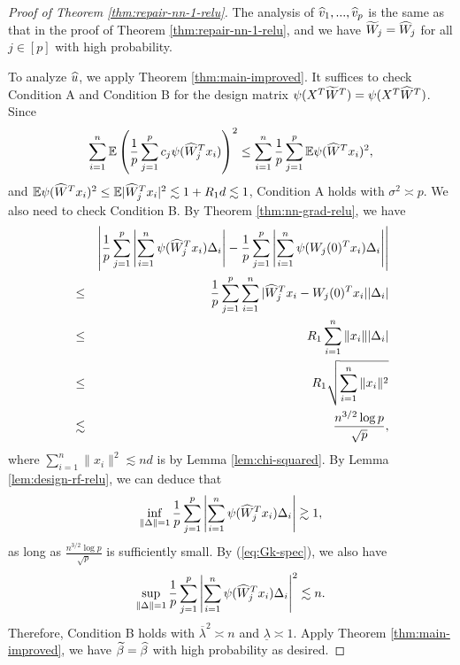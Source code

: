 \begin{proof}[Proof of Theorem \ref{thm:repair-nn-1-relu}]
The analysis of $\widehat{v}_1,...,\widehat{v}_p$ is the same as that in the proof of Theorem \ref{thm:repair-nn-1-relu}, and we have $\widetilde{W}_j=\widehat{W}_j$ for all $j\in[p]$ with high probability.

To analyze $\widehat{u}$, we apply Theorem \ref{thm:main-improved}. It suffices to check Condition A and Condition B for the design matrix $\psi(X^T\widetilde{W}^T)=\psi(X^T\widehat{W}^T)$. Since
$$\sum_{i=1}^n\mathbb{E}\left(\frac{1}{p}\sum_{j=1}^pc_j\psi(\widehat{W}_j^Tx_i)\right)^2\leq \sum_{i=1}^n\frac{1}{p}\sum_{j=1}^p\mathbb{E}\psi(\widehat{W}^Tx_i)^2,$$
and $\mathbb{E}\psi(\widehat{W}^Tx_i)^2\leq \mathbb{E}|\widehat{W}_j^Tx_i|^2\lesssim 1 + R_1d\lesssim 1$, Condition A holds with $\sigma^2\asymp p$.
We also need to check Condition B. By Theorem \ref{thm:nn-grad-relu}, we have
\begin{eqnarray*}
&& \left|\frac{1}{p}\sum_{j=1}^p\left|\sum_{i=1}^n\psi(\wh{W}_j^Tx_i)\Delta_i\right| - \frac{1}{p}\sum_{j=1}^p\left|\sum_{i=1}^n\psi(W_j(0)^Tx_i)\Delta_i\right|\right| \\
&\leq& \frac{1}{p}\sum_{j=1}^p\sum_{i=1}^n|\wh{W}_j^Tx_i-W_j(0)^Tx_i||\Delta_i| \\
&\leq& R_1\sum_{i=1}^n\|x_i\||\Delta_i| \\
&\leq& R_1\sqrt{\sum_{i=1}^n\|x_i\|^2} \\
&\lesssim& \frac{n^{3/2}\log p}{\sqrt{p}},
\end{eqnarray*}
where $\sum_{i=1}^n\|x_i\|^2\lesssim nd$ is by Lemma \ref{lem:chi-squared}. By Lemma \ref{lem:design-rf-relu}, we can deduce that
$$\inf_{\|\Delta\|=1}\frac{1}{p}\sum_{j=1}^p\left|\sum_{i=1}^n\psi(\widehat{W}_j^Tx_i)\Delta_i\right|\gtrsim 1,$$
as long as $\frac{n^{3/2}\log p}{\sqrt{p}}$ is sufficiently small. By (\ref{eq:Gk-spec}), we also have
$$\sup_{\|\Delta\|=1}\frac{1}{p}\sum_{j=1}^p\left|\sum_{i=1}^n\psi(\widehat{W}_j^Tx_i)\Delta_i\right|^2\lesssim n.$$
Therefore, Condition B holds with $\overline{\lambda}^2\asymp n$ and $\underline{\lambda}\asymp 1$. Apply Theorem \ref{thm:main-improved}, we have $\widetilde{\beta}=\widehat{\beta}$ with high probability as desired.
\end{proof}
